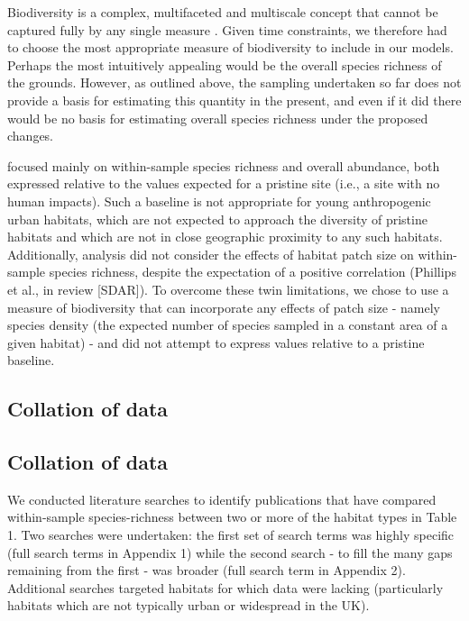 Biodiversity is a complex, multifaceted and multiscale concept that cannot be captured fully by any single measure \citep{Purvis:2000nat}. Given time constraints, we therefore had to choose the most appropriate measure of biodiversity to include in our models. Perhaps the most intuitively appealing would be the overall species richness of the grounds. However, as outlined above, the sampling undertaken so far does not provide a basis for estimating this quantity in the present, and even if it did there would be no basis for estimating overall species richness under the proposed changes.

\cite{Newbold:2015nat} focused mainly on within-sample species richness and overall abundance, both expressed relative to the values expected for a pristine site (i.e., a site with no human impacts). Such a baseline is not appropriate for young anthropogenic urban habitats, which are not expected to approach the diversity of pristine habitats and which are not in close geographic proximity to any such habitats. Additionally, \cite{Newbold:2015nat} analysis did not consider the effects of habitat patch size on within-sample species richness, despite the expectation of a positive correlation (Phillips et al., in review [SDAR]). To overcome these twin limitations, we chose to use a measure of biodiversity that can incorporate any effects of patch size - namely species density (the expected number of species sampled in a constant area of a given habitat) - and did not attempt to express values relative to a pristine baseline.

\ifappendixStyle %
\subsection{Collation of data}%
\else
\subsection*{Collation of data}
\fi

We conducted literature searches to identify publications that have compared within-sample species-richness between two or more of the habitat types in Table 1. Two searches were undertaken: the first set of search terms was highly specific (full search terms in Appendix 1) while the second search - to fill the many gaps remaining from the first - was broader (full search term in Appendix 2). Additional searches targeted habitats for which data were lacking (particularly habitats which are not typically urban or widespread in the UK).

